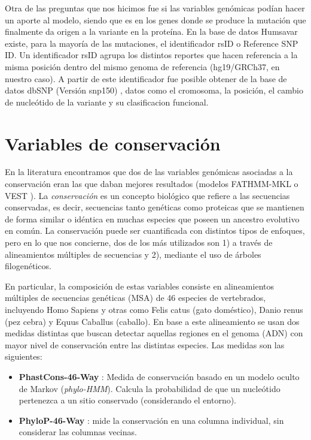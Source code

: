 
Otra de las preguntas que nos hicimos fue si las variables genómicas podían hacer un aporte al modelo, siendo que es en los genes donde se produce la mutación que finalmente da origen a la variante en la proteína. En la base de datos Humsavar existe, para la mayoría de las mutaciones, el identificador rsID o Reference SNP ID. Un identificador rsID agrupa los distintos reportes que hacen referencia a la misma posición dentro del mismo genoma de referencia (hg19/GRCh37, en nuestro caso). A partir de este identificador fue posible obtener de la base de datos dbSNP (Versión snp150) \cite{dbSNP}, datos como el cromosoma, la posición, el cambio de nucleótido de la variante y su clasificacion funcional.

\section{Variables de conservación}

En la literatura encontramos que dos de las variables genómicas asociadas a la conservación eran las que daban mejores resultados (modelos FATHMM-MKL \cite{Shihab2015} o VEST \cite{Carter2013}). La \textit{conservación} es un concepto biológico que refiere a las secuencias conservadas, es decir, secuencias tanto genéticas como proteicas que se mantienen de forma similar o idéntica en muchas especies que poseen un ancestro evolutivo en común. La conservación puede ser cuantificada con distintos tipos de enfoques, pero en lo que nos concierne, dos de los más utilizados son 1) a través de alineamientos múltiples de secuencias y 2), mediante el uso de árboles filogenéticos.

En particular, la composición de estas variables consiste en alineamientos múltiples de secuencias genéticas (MSA) de 46 especies de vertebrados, incluyendo Homo Sapiens y otras como Felis catus (gato doméstico), Danio renus (pez cebra) y Equus Caballus (caballo). En base a este alineamiento se usan dos medidas distintas que buscan detectar aquellas regiones en el genoma (ADN) con mayor nivel de conservación entre las distintas especies. Las medidas son las siguientes:
\begin{itemize}
    \item \textbf{PhastCons-46-Way} \cite{siepel2005evolutionarily}: Medida de conservación basado en un modelo oculto de Markov (\textit{phylo-HMM}). Calcula la probabilidad de que un nucleótido pertenezca a un sitio conservado (considerando el entorno).
    \item \textbf{PhyloP-46-Way} \cite{Pollard2010}: mide la conservación en una columna individual, sin considerar las columnas vecinas.
\end{itemize}

